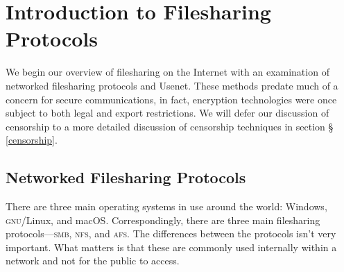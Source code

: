 \section{Introduction to Filesharing Protocols}\label{sec:intro}



We begin our overview of filesharing on the Internet with an examination of
networked filesharing protocols and Usenet. These methods predate
much of a concern for secure communications, in fact, encryption technologies
were once subject to both legal and export restrictions.
We will defer our discussion of censorship to a more detailed discussion of
censorship techniques in section \S
\ref{censorship}.

\subsection{Networked Filesharing Protocols}

There are three main operating systems in use around the world: Windows,
\textsc{gnu}/Linux, and macOS. Correspondingly, there are three main filesharing
protocols---\textsc{smb}, \textsc{nfs}, and \textsc{afs}. The differences
between the protocols isn't very important. What matters is that these are
commonly used internally within a network and not for the public to access.



